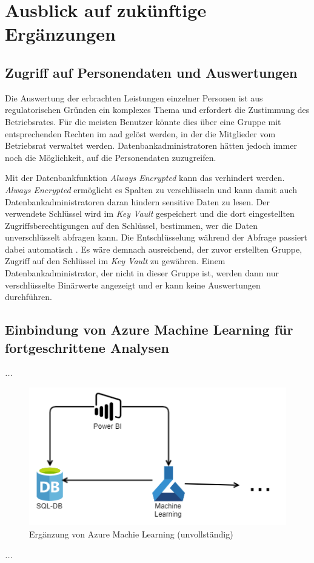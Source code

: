 \section{Ausblick auf zukünftige Ergänzungen} \label{sec:praktischeUmsetzung:ausblick}

\subsection{Zugriff auf Personendaten und Auswertungen}
Die Auswertung der erbrachten Leistungen einzelner Personen ist aus regulatorischen Gründen ein komplexes Thema und erfordert die Zustimmung des Betriebsrates. Für die meisten Benutzer könnte dies über eine Gruppe mit entsprechenden Rechten im \ac{aad} gelöst werden, in der die Mitglieder vom Betriebsrat verwaltet werden. Datenbankadministratoren hätten jedoch immer noch die Möglichkeit, auf die Personendaten zuzugreifen. 

Mit der Datenbankfunktion \textit{Always Encrypted} kann das verhindert werden. \textit{Always Encrypted} ermöglicht es Spalten zu verschlüsseln und kann damit auch Datenbankadministratoren daran hindern sensitive Daten zu lesen. Der verwendete Schlüssel wird im \textit{Key Vault} gespeichert und die dort eingestellten Zugriffsberechtigungen auf den Schlüssel, bestimmen, wer die Daten unverschlüsselt abfragen kann. Die Entschlüsselung während der Abfrage passiert dabei automatisch \cite{mauri_practical_2021}. Es wäre demnach ausreichend, der zuvor erstellten Gruppe, Zugriff auf den Schlüssel im \textit{Key Vault} zu gewähren. Einem Datenbankadministrator, der nicht in dieser Gruppe ist, werden dann nur verschlüsselte Binärwerte angezeigt und er kann keine Auswertungen durchführen.

\subsection{Einbindung von Azure Machine Learning für fortgeschrittene Analysen}
\label{sec:praktischeUmsetzung:ausblick:aml}
\textit{...}

\begin{figure}[htbp]
 \centering
 \includegraphics[width=\textwidth]{gfx/aml.png}
 \caption[Azure Machine Learning]{Ergänzung von Azure Machie Learning (unvollständig)}
\label{fig:praktischeUmsetzung:ausblick:aml}
\end{figure}

\textit{...}